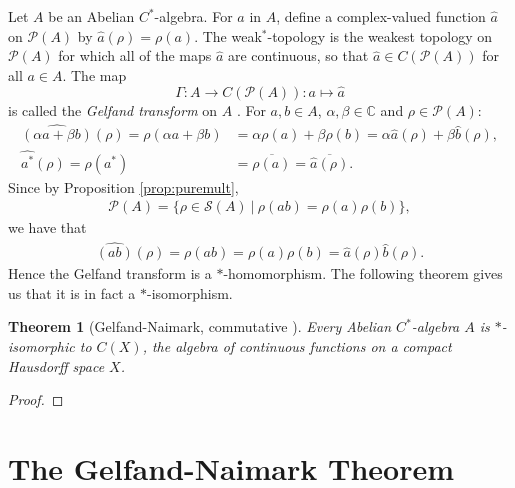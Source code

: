 \documentclass[12pt,a4paper]{report}
\theoremstyle{plain}
\newtheorem{thm}{Theorem}
\theoremstyle{definition}
\newcommand{\1}{\mathbbm{1}}
\newcommand{\C}{\mathbb{C}}
\newcommand{\CX}{C(X)}
\renewcommand{\S}{\mathscr{S}}
\renewcommand{\P}[1]{\mathscr{P}(#1)}
\begin{document}
Let $A$ be an Abelian $C^\ast$-algebra. For $a$ in $A$, define a complex-valued function $\hat{a}$ on
$\P{A}$ by $\hat{a}(\rho)= \rho(a)$. The weak$^\ast$-topology is the weakest topology on 
$\P{A}$ for which all of the maps $\hat{a}$ are continuous, so that $\hat{a} \in C(\P{A})$ for all 
$a\in A$. The map
\[
	\Gamma:A \to C(\P{A}) : a\mapsto \hat{a}
\]
is called the \emph{Gelfand transform} on $A$ \cite{davidson96}.
For $a,b \in A$, $\alpha,\beta\in\C$ and $\rho\in\P{A}$:
\begin{align*}
	\widehat{(\alpha a+\beta b)}(\rho) = \rho(\alpha a+\beta b) 
	&=	\alpha\rho(a) +\beta\rho(b) = \alpha\hat{a}(\rho)+ \beta\hat{b}(\rho), 	\\
	\widehat{a^\ast}(\rho) = \rho(a^\ast) &= \overline{\rho(a)} = \overline{\hat{a}(\rho)}.
\end{align*}
Since by Proposition \ref{prop:puremult},
\begin{align*}
	\P{A} = \{\rho \in \S(A) ~|~ \rho(ab) = \rho(a)\rho(b)\},
\end{align*}
we have that 
\begin{align*}
	\widehat{(ab)} (\rho)= \rho(ab) = \rho(a)\rho(b) = \hat{a}(\rho)\hat{b}(\rho).
\end{align*}
Hence the Gelfand transform is a $\ast$-homomorphism. The following theorem gives us that it is
in fact a $\ast$-isomorphism.

\begin{thm}[{Gelfand-Naimark, commutative \cite[4.4.3]{kadison83}}] 
	Every Abelian $C^\ast$-algebra $A$ is $\ast$-isomorphic to $\CX$, the algebra of continuous
	functions on a compact Hausdorff space $X$.
\end{thm}
\begin{proof}
	
	
\end{proof}%


	
\section{The Gelfand-Naimark Theorem}
\end{document}
